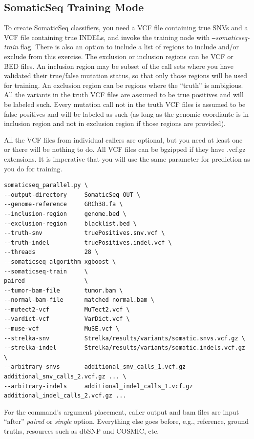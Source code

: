 \documentclass[10pt,letterpaper]{article}
\begin{document}
\begin{sloppypar}
\subsection{SomaticSeq Training Mode} \label{somaticseq_train}

To create SomaticSeq classifiers, you need a VCF file containing true SNVs and a VCF file containing true INDELs, and invoke the training node with \emph{\texttt{--}somaticseq-train} flag. There is also an option to include a list of regions to include and/or exclude from this exercise. The exclusion or inclusion regions can be VCF or BED files. An inclusion region may be subset of the call sets where you have validated their true/false mutation status, so that only those regions will be used for training. An exclusion region can be regions where the ``truth'' is ambigious. All the variants in the truth VCF files are assumed to be true positives and will be labeled such. Every mutation call not in the truth VCF files is assumed to be false positives and will be labeled as such (as long as the genomic coordiante is in inclusion region and not in exclusion region if those regions are provided). 

All the VCF files from individual callers are optional, but you need at least one or there will be nothing to do. All VCF files can be bgzipped if they have .vcf.gz extensions. It is imperative that you will use the same parameter for prediction as you do for training. 


\begin{lstlisting}
somaticseq_parallel.py \
--output-directory     SomaticSeq_OUT \
--genome-reference     GRCh38.fa \
--inclusion-region     genome.bed \
--exclusion-region     blacklist.bed \
--truth-snv            truePositives.snv.vcf \
--truth-indel          truePositives.indel.vcf \
--threads              28 \
--somaticseq-algorithm xgboost \
--somaticseq-train     \
paired                 \
--tumor-bam-file       tumor.bam \
--normal-bam-file      matched_normal.bam \
--mutect2-vcf          MuTect2.vcf \
--vardict-vcf          VarDict.vcf \
--muse-vcf             MuSE.vcf \
--strelka-snv          Strelka/results/variants/somatic.snvs.vcf.gz \
--strelka-indel        Strelka/results/variants/somatic.indels.vcf.gz \
--arbitrary-snvs       additional_snv_calls_1.vcf.gz additional_snv_calls_2.vcf.gz ... \
--arbitrary-indels     additional_indel_calls_1.vcf.gz additional_indel_calls_2.vcf.gz ... 
\end{lstlisting}


For the command's argument placement, caller output and bam files are input ``after'' \textit{paired} or \textit{single} option. Everything else goes before, e.g., reference, ground truths, resources such as dbSNP and COSMIC, etc. 


\end{sloppypar}
\end{document}
